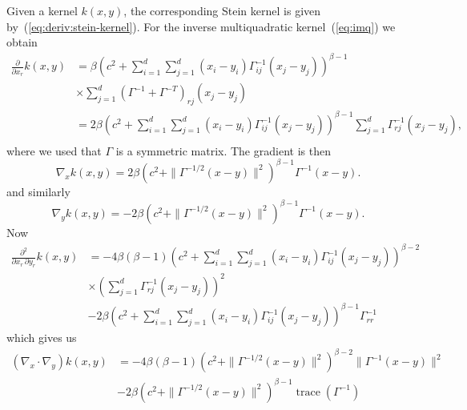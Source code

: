 \documentclass[11pt,a4paper]{report}
\DeclareMathOperator{\trace}{trace}
\begin{document}
Given a kernel $k(x,y)$, the corresponding Stein kernel is given by~(\ref{eq:deriv:stein-kernel}). For the inverse multiquadratic kernel~(\ref{eq:imq}) we obtain
\begin{equation}
\begin{aligned}
\frac{\partial}{\partial x_r} k(x,y) 
&= \beta \left(c^2 + \sum_{i=1}^d\sum_{j=1}^d (x_i-y_i) \Gamma^{-1}_{ij}(x_j-y_j)\right)^{\beta-1} \\
&\times \sum_{j=1}^d (\Gamma^{-1} + \Gamma^{-T})_{rj}(x_j - y_j) \\
&= 2 \beta \left(c^2 + \sum_{i=1}^d\sum_{j=1}^d (x_i-y_i) \Gamma^{-1}_{ij}(x_j-y_j)\right)^{\beta-1}
\sum_{j=1}^d \Gamma^{-1}_{rj}(x_j - y_j), \\
\end{aligned}
\end{equation}
where we used that $\Gamma$ is a symmetric matrix. The gradient is then
\begin{equation}
\nabla_x k(x,y) = 2 \beta \left(c^2 + \| \Gamma^{-1/2} (x-y)\|^2\right)^{\beta-1} \Gamma^{-1} (x - y).
\label{eq:appx:deviv:nablax}
\end{equation}
and similarly
\begin{equation}
\nabla_y k(x,y) = -2 \beta \left(c^2 + \| \Gamma^{-1/2} (x-y)\|^2\right)^{\beta-1} \Gamma^{-1} (x - y).
\label{eq:appx:deviv:nablay}
\end{equation}
Now
\begin{equation}
\begin{aligned}
\frac{\partial^2}{\partial x_r\,\partial y_r} k(x,y) 
&= -4 \beta(\beta-1) \left(c^2 + \sum_{i=1}^d\sum_{j=1}^d (x_i-y_i) \Gamma^{-1}_{ij}(x_j-y_j)\right)^{\beta-2} \\
&\times \left(\sum_{j=1}^d \Gamma^{-1}_{rj}(x_j - y_j)\right)^2 \\
&- 2\beta \left(c^2 + \sum_{i=1}^d\sum_{j=1}^d (x_i-y_i) \Gamma^{-1}_{ij}(x_j-y_j)\right)^{\beta-1} \Gamma^{-1}_{rr}
\end{aligned}
\end{equation}
which gives us
\begin{equation}
\begin{aligned}
(\nabla_x \cdot \nabla_y) k(x,y) 
&= -4 \beta(\beta-1) \left(c^2 + \| \Gamma^{-1/2}(x-y)\|^2\right)^{\beta-2} \| \Gamma^{-1}(x - y)\|^2 \\
&- 2\beta \left(c^2 + \|\Gamma^{-1/2}(x-y)\|^2\right)^{\beta-1} \trace(\Gamma^{-1})
\label{eq:appx:deriv:nablax_nablay}
\end{aligned}
\end{equation}
\end{document}
